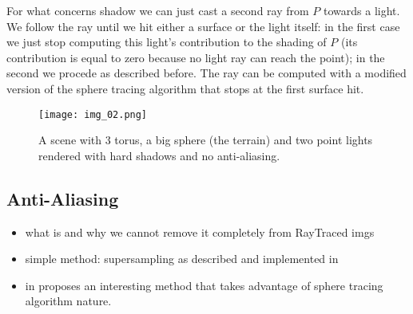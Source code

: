 For what concerns shadow we can just cast a second ray from $P$ towards a light.
We follow the ray until we hit either a surface or the light itself:
in the first case we just stop computing this light's contribution to the shading of $P$ (its contribution is equal to zero because no light ray can reach the point);
in the second we procede as described before.
The ray can be computed with a modified version of the sphere tracing algorithm that stops at the first surface hit.
\begin{figure}[!htb]
  \texttt{[image: img\_02.png]}
  \caption{A scene with 3 torus, a big sphere (the terrain) and two point lights rendered with hard shadows and no anti-aliasing.}
\end{figure}

\subsection{Anti-Aliasing}

\begin{itemize}
  \item what is and why we cannot remove it completely from RayTraced imgs \cite{rt_groundup}

  \item simple method: supersampling as described and implemented in \cite{rt_one_weekend}
  \item in \cite{hart1996} proposes an interesting method that takes advantage of sphere tracing algorithm nature.




\end{itemize}
